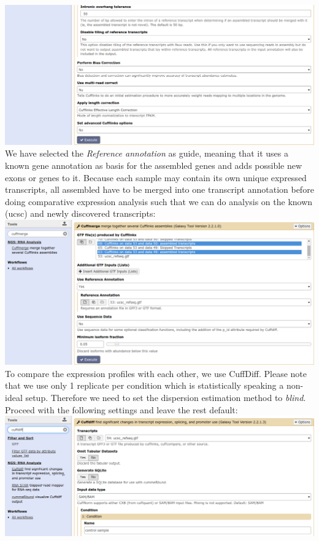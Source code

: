 \documentclass[11pt,a4paper]{article}
\begin{document}
\includegraphics[width=\textwidth]{figures/basic_02b.png}\\
We have selected the \textit{Reference annotation} as guide, meaning that it uses a known gene annotation as basis for the assembled genes and adds possible new exons or genes to it. Because each sample may contain its own unique expressed transcripts, all assembled have to be merged into one transcript annotation before doing comparative expression analysis such that we can do analysis on the known (ucsc) and newly discovered transcripts:\\
\includegraphics[width=\textwidth]{figures/basic_03.png}\\
To compare the expression profiles with each other, we use CuffDiff. Please note that we use only 1 replicate per condition which is statistically speaking a non-ideal setup. Therefore we need to set the dispersion estimation method to \textit{blind}. Proceed with the following settings and leave the rest default:\\
\includegraphics[width=\textwidth]{figures/basic_04a.png}\\
\end{document}
